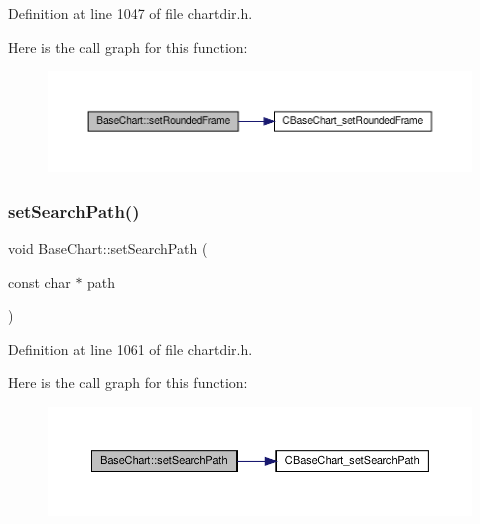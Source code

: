 Definition at line 1047 of file chartdir.\+h.

Here is the call graph for this function\+:
\nopagebreak
\begin{figure}[H]
\begin{center}
\leavevmode
\includegraphics[width=350pt]{class_base_chart_a5809eecf03754e7211a3d8712b3ff010_cgraph}
\end{center}
\end{figure}
\mbox{\label{class_base_chart_a516a494b8b4e42478f2df639a834e387}} 
\subsubsection{\texorpdfstring{set\+Search\+Path()}{setSearchPath()}}
{\footnotesize\ttfamily void Base\+Chart\+::set\+Search\+Path (\begin{DoxyParamCaption}\item[{const char $\ast$}]{path }\end{DoxyParamCaption})\hspace{0.3cm}{\ttfamily [inline]}}



Definition at line 1061 of file chartdir.\+h.

Here is the call graph for this function\+:
\nopagebreak
\begin{figure}[H]
\begin{center}
\leavevmode
\includegraphics[width=350pt]{class_base_chart_a516a494b8b4e42478f2df639a834e387_cgraph}
\end{center}
\end{figure}
\mbox{\label{class_base_chart_a094bfc84860d6671e638ccd2c96bd364}} 
